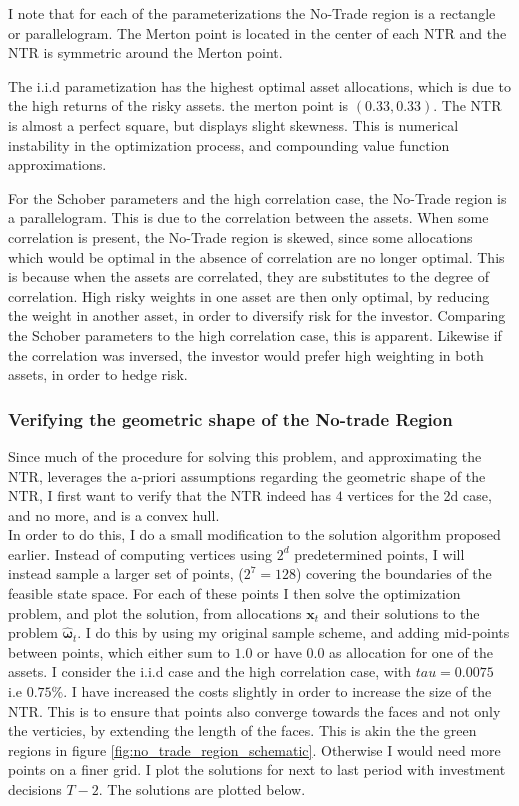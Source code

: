 \documentclass[11pt]{article}
\begin{document}
I note that for each of the parameterizations the No-Trade region is a rectangle or parallelogram.
The Merton point is located in the center of each \ac{NTR} and the \ac{NTR} is symmetric around the Merton point.

The i.i.d parametization has the highest optimal asset allocations, which is due to the high returns of the risky assets. the merton point is $(0.33, 0.33)$.
The NTR is almost a perfect square, but displays slight skewness. This is numerical instability in the optimization process, and compounding value function approximations.

For the Schober parameters and the high correlation case,
the No-Trade region is a parallelogram. This is due to the correlation between the assets. When some correlation is present, the No-Trade region is skewed,
since some allocations which would be optimal in the absence of correlation are no longer optimal. 
This is because when the assets are correlated, they are substitutes to the degree of correlation. High risky weights in one asset are then only optimal,
by reducing the weight in another asset, in order to diversify risk for the investor. Comparing the Schober parameters to the high correlation case, this is apparent.
Likewise if the correlation was inversed, the investor would prefer high weighting in both assets, in order to hedge risk. 

\subsubsection{Verifying the geometric shape of the No-trade Region}\label{Subsubsection: ConfirmShape}
Since much of the procedure for solving this problem, and approximating the \ac{NTR}, leverages
the a-priori assumptions regarding the geometric shape of the \ac{NTR}, I first want to verify that the
\ac{NTR} indeed has $4$ vertices for the 2d case, and no more, and is a convex hull.\\
In order to do this, I do a small modification to the solution algorithm proposed earlier.
Instead of computing vertices using $2^{d}$ predetermined points, I will instead
sample a larger set of points, ($2^7 = 128$) covering the boundaries of the feasible state space.
For each of these points I then solve the optimization problem,
and plot the solution, from allocations $\mathbf{x}_{t}$ and their solutions to the problem $\hat{\boldsymbol{\omega}}_{t}$.
I do this by using my original sample scheme, and adding mid-points between points,
which either sum to $1.0$ or have $0.0$ as allocation for one of the assets.
I consider the i.i.d case and the high correlation case, with $tau = 0.0075$ i.e $0.75\%$. I have increased the costs slightly in order to increase the
size of the NTR. This is to ensure that points also converge towards the faces and not only the verticies, by extending the length of the faces.
This is akin the the green regions in figure \ref{fig:no_trade_region_schematic}.
Otherwise I would need more points on a finer grid. I plot the solutions for next to last period with investment decisions $T-2$.
The solutions are plotted below.
\end{document}
